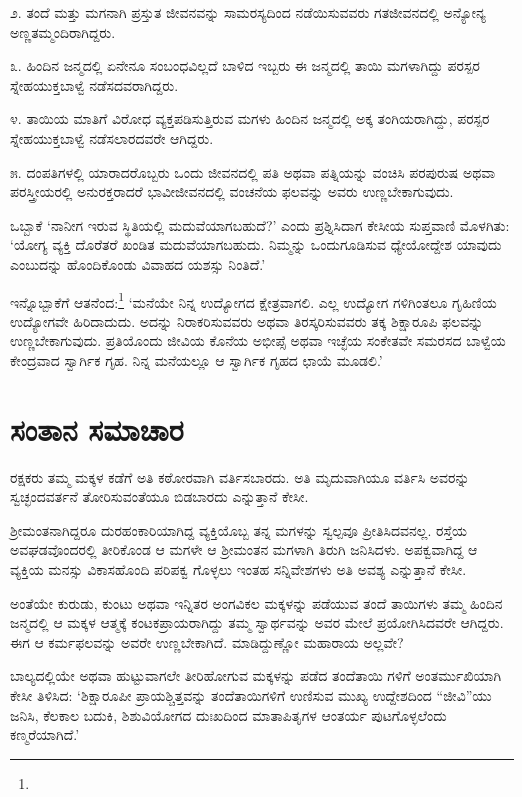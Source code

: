 ೨. ತಂದೆ ಮತ್ತು ಮಗನಾಗಿ ಪ್ರಸ್ತುತ ಜೀವನವನ್ನು ಸಾಮರಸ್ಯದಿಂದ ನಡೆಯಿಸುವವರು ಗತಜೀವನದಲ್ಲಿ ಅನ್ಯೋನ್ಯ ಅಣ್ಣತಮ್ಮಂದಿರಾಗಿದ್ದರು.

೩. ಹಿಂದಿನ ಜನ್ಮದಲ್ಲಿ ಏನೇನೂ ಸಂಬಂಧವಿಲ್ಲದೆ ಬಾಳಿದ ಇಬ್ಬರು ಈ ಜನ್ಮದಲ್ಲಿ ತಾಯಿ ಮಗಳಾಗಿದ್ದು ಪರಸ್ಪರ ಸ್ನೇಹಯುಕ್ತಬಾಳ್ವೆ ನಡೆಸದವರಾಗಿದ್ದರು.

೪. ತಾಯಿಯ ಮಾತಿಗೆ ವಿರೋಧ ವ್ಯಕ್ತಪಡಿಸುತ್ತಿರುವ ಮಗಳು ಹಿಂದಿನ ಜನ್ಮದಲ್ಲಿ ಅಕ್ಕ ತಂಗಿಯರಾಗಿದ್ದು, ಪರಸ್ಪರ ಸ್ನೇಹಯುಕ್ತಬಾಳ್ವೆ ನಡೆಸಲಾರದವರೇ ಆಗಿದ್ದರು.

೫. ದಂಪತಿಗಳಲ್ಲಿ ಯಾರಾದರೊಬ್ಬರು ಒಂದು ಜೀವನದಲ್ಲಿ ಪತಿ ಅಥವಾ ಪತ್ನಿಯನ್ನು ವಂಚಿಸಿ ಪರಪುರುಷ ಅಥವಾ ಪರಸ್ತ್ರೀಯರಲ್ಲಿ ಅನುರಕ್ತರಾದರೆ ಭಾವೀಜೀವನದಲ್ಲಿ ವಂಚನೆಯ ಫಲವನ್ನು ಅವರು ಉಣ್ಣಬೇಕಾಗುವುದು.

ಒಬ್ಬಾಕೆ ‘ನಾನೀಗ ಇರುವ ಸ್ಥಿತಿಯಲ್ಲಿ ಮದುವೆಯಾಗಬಹುದೆ?’ ಎಂದು ಪ್ರಶ್ನಿಸಿದಾಗ ಕೇಸೀಯ ಸುಪ್ತವಾಣಿ ಮೊಳಗಿತು: ‘ಯೋಗ್ಯ ವ್ಯಕ್ತಿ ದೊರೆತರೆ ಖಂಡಿತ ಮದುವೆಯಾಗಬಹುದು. ನಿಮ್ಮನ್ನು ಒಂದುಗೂಡಿಸುವ ಧ್ಯೇಯೋದ್ದೇಶ ಯಾವುದು ಎಂಬುದನ್ನು ಹೊಂದಿಕೊಂಡು ವಿವಾಹದ ಯಶಸ್ಸು ನಿಂತಿದೆ.’

ಇನ್ನೊಬ್ಬಾಕೆಗೆ ಆತನೆಂದ:\footnote{} ‘ಮನೆಯೇ ನಿನ್ನ ಉದ್ಯೋಗದ ಕ್ಷೇತ್ರವಾಗಲಿ. ಎಲ್ಲ ಉದ್ಯೋಗ ಗಳಿಗಿಂತಲೂ ಗೃಹಿಣಿಯ ಉದ್ಯೋಗವೇ ಹಿರಿದಾದುದು. ಅದನ್ನು ನಿರಾಕರಿಸುವವರು ಅಥವಾ ತಿರಸ್ಕರಿಸುವವರು ತಕ್ಕ ಶಿಕ್ಷಾರೂಪಿ ಫಲವನ್ನು ಉಣ್ಣಬೇಕಾಗುವುದು. ಪ್ರತಿಯೊಂದು ಜೀವಿಯ ಕೊನೆಯ ಅಭೀಪ್ಸೆ ಅಥವಾ ಇಚ್ಛೆಯ ಸಂಕೇತವೇ ಸಮರಸದ ಬಾಳ್ವೆಯ ಕೇಂದ್ರವಾದ ಸ್ವಾರ್ಗಿಕ ಗೃಹ. ನಿನ್ನ ಮನೆಯಲ್ಲೂ ಆ ಸ್ವಾರ್ಗಿಕ ಗೃಹದ ಛಾಯೆ ಮೂಡಲಿ.’


\section{ಸಂತಾನ ಸಮಾಚಾರ}

ರಕ್ಷಕರು ತಮ್ಮ ಮಕ್ಕಳ ಕಡೆಗೆ ಅತಿ ಕಠೋರವಾಗಿ ವರ್ತಿಸಬಾರದು. ಅತಿ ಮೃದುವಾಗಿಯೂ ವರ್ತಿಸಿ ಅವರನ್ನು ಸ್ವಚ್ಛಂದವರ್ತನೆ ತೋರಿಸುವಂತೆಯೂ ಬಿಡಬಾರದು ಎನ್ನುತ್ತಾನೆ ಕೇಸೀ.

ಶ‍್ರೀಮಂತನಾಗಿದ್ದರೂ ದುರಹಂಕಾರಿಯಾಗಿದ್ದ ವ್ಯಕ್ತಿಯೊಬ್ಬ ತನ್ನ ಮಗಳನ್ನು ಸ್ವಲ್ಪವೂ ಪ್ರೀತಿಸಿದವನಲ್ಲ. ರಸ್ತೆಯ ಅವಘಡವೊಂದರಲ್ಲಿ ತೀರಿಕೊಂಡ ಆ ಮಗಳೇ ಆ ಶ‍್ರೀಮಂತನ ಮಗಳಾಗಿ ತಿರುಗಿ ಜನಿಸಿದಳು. ಅಪಕ್ವವಾಗಿದ್ದ ಆ ವ್ಯಕ್ತಿಯ ಮನಸ್ಸು ವಿಕಾಸಹೊಂದಿ ಪರಿಪಕ್ವ ಗೊಳ್ಳಲು ಇಂತಹ ಸನ್ನಿವೇಶಗಳು ಅತಿ ಅವಶ್ಯ ಎನ್ನುತ್ತಾನೆ ಕೇಸೀ.

ಅಂತೆಯೇ ಕುರುಡು, ಕುಂಟು ಅಥವಾ ಇನ್ನಿತರ ಅಂಗವಿಕಲ ಮಕ್ಕಳನ್ನು ಪಡೆಯುವ ತಂದೆ ತಾಯಿಗಳು ತಮ್ಮ ಹಿಂದಿನ ಜನ್ಮದಲ್ಲಿ ಆ ಮಕ್ಕಳ ಆತ್ಮಕ್ಕೆ ಕಂಟಕಪ್ರಾಯರಾಗಿದ್ದು ತಮ್ಮ ಸ್ವಾರ್ಥವನ್ನು ಅವರ ಮೇಲೆ ಪ್ರಯೋಗಿಸಿದವರೇ ಆಗಿದ್ದರು. ಈಗ ಆ ಕರ್ಮಫಲವನ್ನು ಅವರೇ ಉಣ್ಣಬೇಕಾಗಿದೆ. ಮಾಡಿದ್ದುಣ್ಣೋ ಮಹಾರಾಯ ಅಲ್ಲವೇ?

ಬಾಲ್ಯದಲ್ಲಿಯೇ ಅಥವಾ ಹುಟ್ಟುವಾಗಲೇ ತೀರಿಹೋಗುವ ಮಕ್ಕಳನ್ನು ಪಡೆದ ತಂದೆತಾಯಿ ಗಳಿಗೆ ಅಂತರ್ಮುಖಿಯಾಗಿ ಕೇಸೀ ತಿಳಿಸಿದ: ‘ಶಿಕ್ಷಾರೂಪೀ ಪ್ರಾಯಶ್ಚಿತ್ತವನ್ನು ತಂದೆತಾಯಿಗಳಿಗೆ ಉಣಿಸುವ ಮುಖ್ಯ ಉದ್ದೇಶದಿಂದ “ಜೀವಿ”ಯು ಜನಿಸಿ, ಕೆಲಕಾಲ ಬದುಕಿ, ಶಿಶುವಿಯೋಗದ ದುಃಖದಿಂದ ಮಾತಾಪಿತೃಗಳ ಆಂತರ್ಯ ಪುಟಗೊಳ್ಳಲೆಂದು ಕಣ್ಮರೆಯಾಗಿದೆ.’



